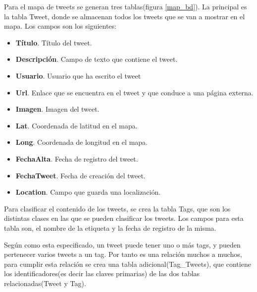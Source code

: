\vspace{5 mm}

Para el mapa de tweets se generan tres tablas(figura \ref{map_bd}). La principal es la tabla Tweet, donde se almacenan todos los tweets que se van a mostrar en el mapa. Los campos son los siguientes:


\begin{itemize}

\item \textbf{Título}. Título del tweet.
\item \textbf{Descripción}. Campo de texto que contiene el tweet.
\item \textbf{Usuario}. Usuario que ha escrito el tweet
\item \textbf{Url}. Enlace que se encuentra en el tweet y que conduce a una página externa.
\item \textbf{Imagen}. Imagen del tweet.
\item \textbf{Lat}. Coordenada de latitud en el mapa.
\item \textbf{Long}. Coordenada de longitud en el mapa.
\item \textbf{FechaAlta}. Fecha de registro del tweet.
\item \textbf{FechaTweet}. Fecha de creación del tweet.
\item \textbf{Location}. Campo que guarda una localización.

\end{itemize}


\vspace{5 mm}


Para clasificar el contenido de los tweets, se crea la tabla Tags, que son los distintas clases en las que se pueden clasificar los tweets. Los campos para esta tabla son, el nombre de la etiqueta y la fecha de registro de la misma.

\vspace{5 mm}

Según como esta especificado, un tweet puede tener uno o más tags, y pueden pertenecer varios tweets a un tag. Por tanto es una relación muchos a muchos, para cumplir esta relación se crea una tabla adicional(Tag\_Tweets), que contiene los identificadores(es decir las claves primarias) de las dos tablas relacionadas(Tweet y Tag).
